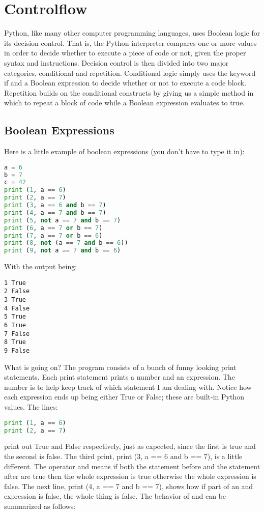 \section{Controlflow}
Python, like many other computer programming languages, uses Boolean logic for
its decision control. That is, the Python interpreter compares one or more
values in order to decide whether to execute a piece of code or not, given the
proper syntax and instructions.  Decision control is then divided into two major
categories, conditional and repetition. Conditional logic simply uses the
keyword if and a Boolean expression to decide whether or not to execute a code
block. Repetition builds on the conditional constructs by giving us a simple
method in which to repeat a block of code while a Boolean expression evaluates
to true.
\subsection{Boolean Expressions}
Here is a little example of boolean expressions (you don't have to type it in):
\lstset{basicstyle=\scriptsize, numbers=left, captionpos=b, tabsize=4}
\begin{lstlisting}[caption=Controlflow 1,language={Python},
xleftmargin=15pt, label=lst:controlflow1]
a = 6
b = 7
c = 42
print (1, a == 6)
print (2, a == 7)
print (3, a == 6 and b == 7)
print (4, a == 7 and b == 7)
print (5, not a == 7 and b == 7)
print (6, a == 7 or b == 7)
print (7, a == 7 or b == 6)
print (8, not (a == 7 and b == 6))
print (9, not a == 7 and b == 6)
\end{lstlisting}
With the output being:
\scriptsize
\begin{verbatim}
1 True
2 False
3 True
4 False
5 True
6 True
7 False
8 True
9 False
\end{verbatim}
\normalsize
What is going on? The program consists of a bunch of funny looking print
statements. Each print statement prints a number and an expression. The number
is to help keep track of which statement I am dealing with. Notice how each
expression ends up being either True or False; these are built-in Python values.
The lines:
\lstset{basicstyle=\scriptsize, numbers=left, captionpos=b, tabsize=4}
\begin{lstlisting}[caption=Controlflow 2,language={Python},
xleftmargin=15pt, label=lst:controlflow2]
print (1, a == 6)
print (2, a == 7)
\end{lstlisting}
print out True and False respectively, just as expected, since the first is true
and the second is false. The third print, print (3, a == 6 and b == 7), is a
little different. The operator and means if both the statement before and the
statement after are true then the whole expression is true otherwise the whole
expression is false. The next line, print (4, a == 7 and b == 7), shows how if
part of an and expression is false, the whole thing is false. The behavior of
and can be summarized as follows:

